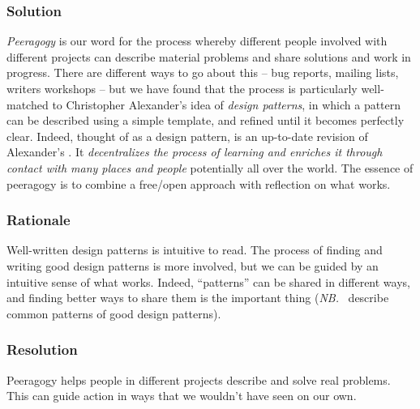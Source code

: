 \subsubsection*{Solution} \emph{Peeragogy} is our word for the process whereby different people involved with different projects can describe material problems and share solutions and work in progress.  There are different ways to go about this -- bug reports, mailing lists, writers workshops -- but we have found that the process is particularly well-matched to Christopher Alexander's idea of \emph{design patterns}, in which a pattern can be described using a simple template, and refined until it becomes perfectly clear.  Indeed, thought of as a design pattern,  is an up-to-date revision of Alexander's  \cite[p. 99]{alexander1977pattern}.  It \emph{decentralizes the process of learning and enriches it through contact with many places and people} potentially all over the world.   The essence of peeragogy is to combine a free/open approach with reflection on what works.

\subsubsection*{Rationale}
Well-written design patterns is intuitive to read.  The process of finding and writing good design patterns is more involved, but we can be guided by an intuitive sense of what works.
Indeed, ``patterns'' can be shared in different ways, and finding better ways to share them is the important thing (\emph{NB.}~\cite{meszaros1998pattern} describe common patterns of good design patterns).

\subsubsection*{Resolution}
Peeragogy helps people in different projects describe and solve real problems.  This can guide action in ways that we wouldn't have seen on our own.

